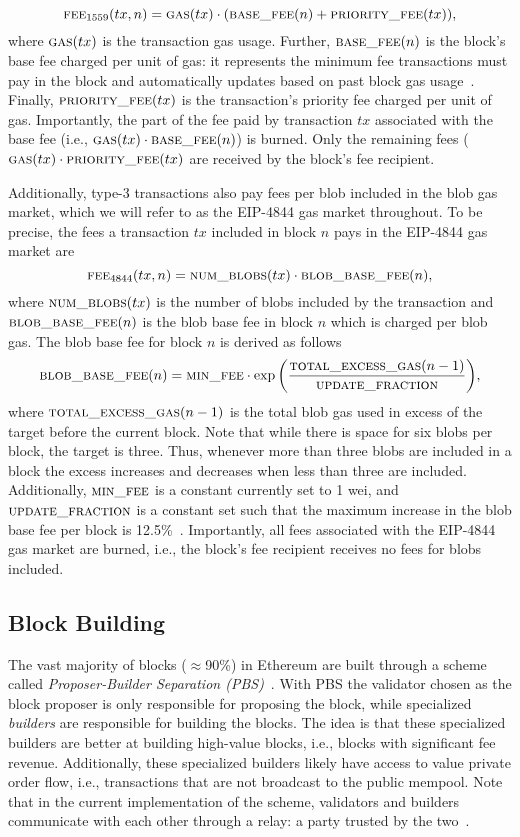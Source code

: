 $$ \textsc{fee}_{1559} (tx,n) = \textsc{gas}(tx) \cdot (\textsc{base\_fee}(n) + \textsc{priority\_fee}(tx)),$$
where $\textsc{gas}(tx)$ is the transaction gas usage. Further, $\textsc{base\_fee}(n)$ is the block's base fee charged per unit of gas: it represents the minimum fee transactions must pay in the block and automatically updates based on past block gas usage~\parencite{ethereum2024eip1559}.  Finally, $ \textsc{priority\_fee}(tx)$ is the transaction's priority fee charged per unit of gas. Importantly, the part of the fee paid by transaction $tx$ associated with the base fee (i.e., $\textsc{gas}(tx) \cdot \textsc{base\_fee}(n)$) is burned. Only the remaining fees ($\textsc{gas}(tx) \cdot \textsc{priority\_fee}(tx)$ are received by the block's fee recipient. 

Additionally, type-3 transactions also pay fees per blob included in the blob gas market, which we will refer to as the EIP-4844 gas market throughout. To be precise, the fees a transaction $tx$ included in block $n$ pays in the EIP-4844 gas market are
$$ \textsc{fee}_{4844} (tx,n) = \textsc{num\_blobs}(tx) \cdot \textsc{blob\_base\_fee}(n),$$
where $\textsc{num\_blobs}(tx) $ is the number of blobs included by the transaction and $ \textsc{blob\_base\_fee}(n)$ is the blob base fee in block $n$ which is charged per blob gas. The blob base fee for block $n$ is derived as follows
$$\textsc{blob\_base\_fee}(n)=\textsc{min\_fee}\cdot \exp{\left(\frac{\textsc{total\_excess\_gas}(n-1)}{\textsc{update\_fraction}}\right)},$$
where $\textsc{total\_excess\_gas}(n-1)$ is the total blob gas used in excess of the target before the current block. Note that while there is space for six blobs per block, the target is three. Thus, whenever more than three blobs are included in a block the excess increases and decreases when less than three are included. Additionally, $\textsc{min\_fee}$ is a constant currently set to 1 wei, and $\textsc{update\_fraction}$ is a constant set such that the maximum increase in the blob base fee per block is 12.5\%~\parencite{ethereum2024eip4844}. Importantly, all fees associated with the EIP-4844 gas market are burned, i.e., the block's fee recipient receives no fees for blobs included.

\subsection{Block Building}\label{subsec:block_building}
The vast majority of blocks ($\approx$90\%) in Ethereum are built through a scheme called \textit{Proposer-Builder Separation (PBS)}~\parencite{wahrstatter2024}. With PBS the validator chosen as the block proposer is only responsible for proposing the block, while specialized \textit{builders} are responsible for building the blocks. The idea is that these specialized builders are better at building high-value blocks, i.e., blocks with significant fee revenue. Additionally, these specialized builders likely have access to value private order flow, i.e., transactions that are not broadcast to the public mempool. Note that in the current implementation of the scheme, validators and builders communicate with each other through a relay: a party trusted by the two~\parencite{flashbots2024}. 



